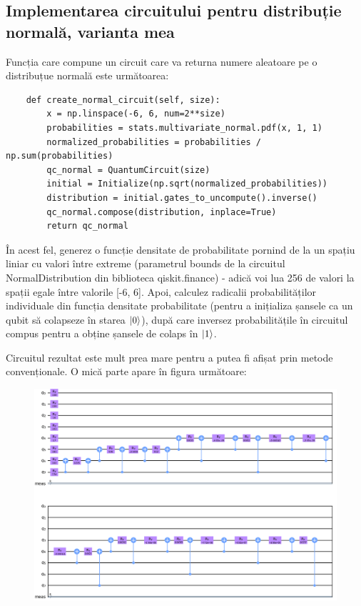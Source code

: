 \subsection{Implementarea circuitului pentru distribuție normală, varianta mea}
Funcția care compune un circuit care va returna numere aleatoare pe o distribuțue normală este următoarea:
\begin{code}
\begin{verbatim}
    def create_normal_circuit(self, size):
        x = np.linspace(-6, 6, num=2**size)
        probabilities = stats.multivariate_normal.pdf(x, 1, 1)
        normalized_probabilities = probabilities / np.sum(probabilities)
        qc_normal = QuantumCircuit(size)
        initial = Initialize(np.sqrt(normalized_probabilities))
        distribution = initial.gates_to_uncompute().inverse()
        qc_normal.compose(distribution, inplace=True)
        return qc_normal
\end{verbatim}
\end{code}
În acest fel, generez o funcție densitate de probabilitate pornind de la un spațiu liniar cu valori între extreme (parametrul bounds de la circuitul NormalDistribution din biblioteca qiskit.finance) - adică voi lua 256 de valori la spații egale între valorile [-6, 6]. Apoi, calculez radicalii probabilităților individuale din funcția densitate probabilitate (pentru a inițializa șansele ca un qubit să colapseze în starea $\ket{0}$), după care inversez probabilitățile în circuitul compus pentru a obține șansele de colaps în $\ket{1}$. 

Circuitul rezultat este mult prea mare pentru a putea fi afișat prin metode convenționale. O mică parte apare în figura următoare:
\begin{figure}[H]
    \centering
    \includegraphics[width=1.0\textwidth]{continut/capitol3/figuri/CircuitNormal.png}
    \label{fig:CircuitNormal}
\end{figure}


